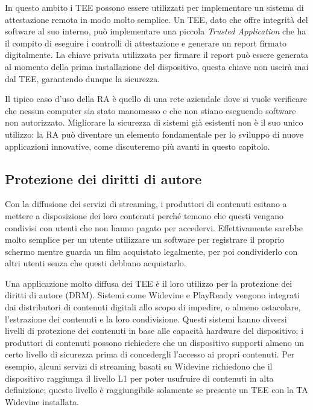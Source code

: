 \documentclass[12pt,italian]{report}
\begin{document}
In questo ambito i TEE possono essere utilizzati per implementare un sistema
di attestazione remota in modo molto semplice.
Un TEE, dato che offre integrità del software al suo interno, può implementare
una piccola \textit{Trusted Application} che ha il compito di eseguire
i controlli di attestazione e generare un report firmato digitalmente.
La chiave privata utilizzata per firmare il report può essere generata al
momento della prima installazione del dispositivo, questa chiave non uscirà
mai dal TEE, garantendo dunque la sicurezza.

Il tipico caso d'uso della RA è quello di una rete aziendale dove si
vuole verificare che nessun computer sia stato manomesso
e che non stiano eseguendo software non autorizzato.
Migliorare la sicurezza di sistemi già esistenti non è il suo unico utilizzo:
la RA può diventare un elemento fondamentale per lo sviluppo di nuove
applicazioni innovative, come discuteremo più avanti in questo capitolo.

\subsection{Protezione dei diritti di autore}
\label{subsec:drm}
Con la diffusione dei servizi di streaming, i produttori di contenuti esitano
a mettere a disposizione dei loro contenuti perché temono che questi vengano
condivisi con utenti che non hanno pagato per accedervi.
Effettivamente sarebbe molto semplice per un utente utilizzare un software per
registrare il proprio schermo mentre guarda un film acquistato legalmente, per
poi condividerlo con altri utenti senza che questi debbano acquistarlo.

Una applicazione molto diffusa dei TEE è il loro utilizzo per la protezione
dei diritti di autore (DRM). 
Sistemi come Widevine\cite{widevine} e PlayReady\cite{playready} vengono
integrati dai distributori di contenuti digitali allo scopo di impedire, o
almeno ostacolare, l'estrazione dei contenuti e la loro condivisione.
Questi sistemi hanno diversi livelli di protezione dei contenuti in base alle
capacità hardware del dispositivo; i produttori di contenuti possono richiedere
che un dispositivo supporti almeno un certo livello di sicurezza prima di
concedergli l'accesso ai propri contenuti.
Per esempio, alcuni servizi di streaming basati su Widevine richiedono che il
dispositivo raggiunga il livello L1 per poter usufruire di contenuti in alta
definizione; questo livello è raggiungibile solamente se presente un TEE con
la TA Widevine installata.
\end{document}
